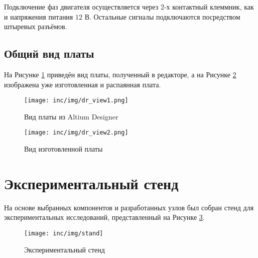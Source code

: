 Подключение фаз двигателя осуществляется через 2-х контактный клеммник, как и напряжения питания $12$ В. Остальные сигналы подключаются посредством штыревых разъёмов.

\subsection{Общий вид платы}

На Рисунке \ref{pic:dr_view1} приведён вид платы, полученный в редакторе, а на Рисунке \ref{pic:dr_view2} изображена уже изготовленная и распаянная плата.

\begin{figure}[!h]
\centering
\texttt{[image: inc/img/dr\_view1.png]}
\caption{Вид платы из Altium Designer}
\label{pic:dr_view1}
\end{figure}

\begin{figure}[!h]
\centering
\texttt{[image: inc/img/dr\_view2.png]}
\caption{Вид изготовленной платы}
\label{pic:dr_view2}
\end{figure}
\clearpage
\section{Экспериментальный стенд}

На основе выбранных компонентов и разработанных узлов был собран стенд для экспериментальных исследований, представленный на Рисунке \ref{pic:stand}.

\begin{figure}[!h]
\centering
\texttt{[image: inc/img/stand]}
\caption{Экспериментальный стенд}
\label{pic:stand}
\end{figure}